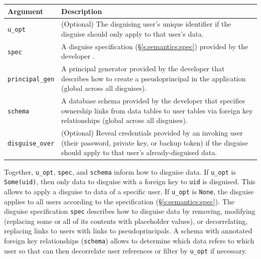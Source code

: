     \begin{center}
    \begin{longtable}{|m{}|m{}|}
        \hline
        \textbf{Argument} & \textbf{Description} \\
        \hline
        \texttt{u\_opt}& (Optional) The disguising user's unique identifier if
        the disguise should only apply to that user's data.\\ 
        \hline
        \texttt{spec}& A disguise specification (\S\ref{s:semantics:spec})
        provided by the developer .\\

        \hline
        \texttt{principal\_gen}& A principal generator provided by the developer
        that describes how to create a pseudoprincipal in the application
        (global across all disguises).\\
        \hline
        \texttt{schema}& A database schema provided by the developer that
        specifies ownership links from data tables to user tables via foreign
        key relationships (global across all disguises).\\

        \hline
        \texttt{disguise\_over}& (Optional) Reveal credentials provided by an
        invoking user (their password, private key, or backup token) if the
        disguise should apply to that user's already-disguised data.
\\
        \hline
    \end{longtable}
    \end{center}
    \vspace{-24pt}

Together, \texttt{u\_opt}, \texttt{spec}, and \texttt{schema} inform \sys how to
disguise data.  If \texttt{u\_opt} is \texttt{Some(uid)}, then only data to
disguise with a foreign key to \texttt{uid} is disguised. This allows \sys to
apply a disguise to data of a specific user. 
%
If \texttt{u\_opt} is \texttt{None}, the disguise applies to all users according
to the specification (\S\ref{s:semantics:spec}).
%
The disguise specification \texttt{spec} describes how to disguise data by
removing, modifying (replacing some or all of its contents with placeholder
values), or decorrelating, replacing links to users with links to
pseudoprincipals.
%
A schema with annotated foreign key relationships (\texttt{schema}) allows \sys
to determine which data refers to which user so that \sys can then decorrelate
user references or filter by \texttt{u\_opt} if necessary. 

